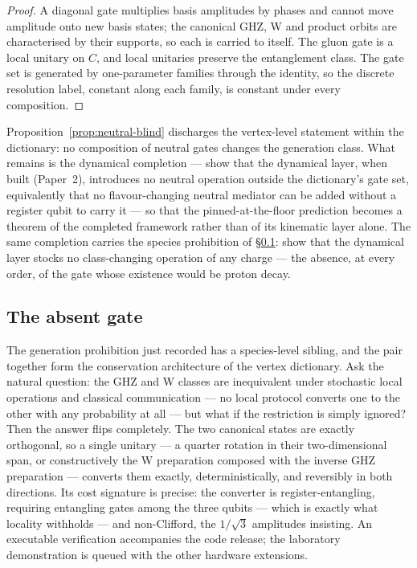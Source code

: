 \begin{proof}
A diagonal gate multiplies basis amplitudes by phases and cannot move amplitude onto new basis
states; the canonical GHZ, W and product orbits are characterised by their supports, so each is
carried to itself. The gluon gate is a local unitary on $C$, and local unitaries preserve the
entanglement class. The gate set is generated by one-parameter families through the identity, so
the discrete resolution label, constant along each family, is constant under every composition.
\end{proof}

\begin{openproblem}\label{op:fcnc-all-orders}
Proposition~\ref{prop:neutral-blind} discharges the vertex-level statement within the dictionary:
no composition of neutral gates changes the generation class. What remains is the dynamical
completion --- show that the dynamical layer, when built (Paper~2), introduces no neutral operation
outside the dictionary's gate set, equivalently that no flavour-changing neutral mediator can be
added without a register qubit to carry it --- so that the pinned-at-the-floor prediction becomes a
theorem of the completed framework rather than of its kinematic layer alone. The same completion
carries the species prohibition of \S\ref{sec:absent-gate}: show that the dynamical layer stocks
no class-changing operation of any charge --- the absence, at every order, of the gate whose
existence would be proton decay.
\end{openproblem}

\subsection{The absent gate}\label{sec:absent-gate}

The generation prohibition just recorded has a species-level sibling, and the pair together form
the conservation architecture of the vertex dictionary. Ask the natural question: the GHZ and W
classes are inequivalent under stochastic local operations and classical communication --- no local
protocol converts one to the other with any probability at all \autocite{durvidalcirac2000three}
--- but what if the restriction is simply ignored? Then the answer flips completely. The two
canonical states are exactly orthogonal, so a single unitary --- a quarter rotation in their
two-dimensional span, or constructively the W preparation composed with the inverse GHZ preparation
--- converts them exactly, deterministically, and reversibly in both directions. Its cost signature
is precise: the converter is register-entangling, requiring entangling gates among the three qubits
--- which is exactly what locality withholds --- and non-Clifford, the $1/\sqrt3$ amplitudes
insisting. An executable verification accompanies the code release; the laboratory demonstration is
queued with the other hardware extensions.

